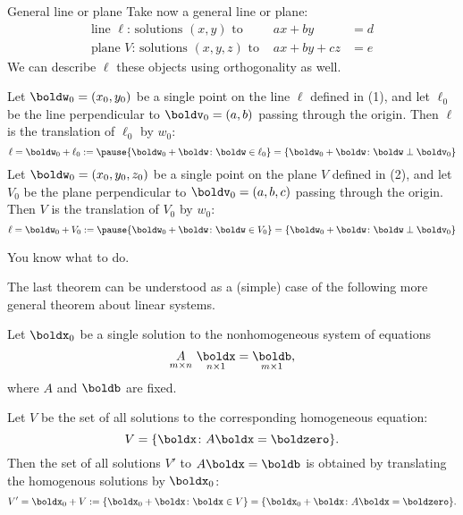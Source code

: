 \begin{frame}{General line or plane}
Take now a general line or plane:
\begin{eqnarray}
\text{line $\ell$: solutions $(x,y)$ to } &ax+by&=d\\
\text{plane $V$: solutions $(x,y,z)$ to } &ax+by+cz&=e
\end{eqnarray}
\pause 
We can describe $\ell$ these objects using orthogonality as well. 
\begin{theorem}
Let $\boldw_0=(x_0,y_0)$ be a single point on the line $\ell$ defined in (1), and let $\ell_0$ be the line perpendicular to $\boldv_0=(a,b)$ passing through the origin. Then $\ell$ is the translation of $\ell_0$ by $w_0$: 
\[
\ell=\boldw_0+\ell_0:=\pause\{\boldw_0+\boldw\colon \boldw\in\ell_0\}=
\{\boldw_0+\boldw\colon \boldw\perp\boldv_0\}
\]
\pause
Let $\boldw_0=(x_0,y_0,z_0)$ be a single point on the plane $V$ defined in (2), and let $V_0$ be the plane perpendicular to $\boldv_0=(a,b,c)$ passing through the origin. Then $V$ is the translation of $V_0$ by $w_0$: 
\[
\ell=\boldw_0+V_0:=\pause\{\boldw_0+\boldw\colon \boldw\in V_0\}=
\{\boldw_0+\boldw\colon \boldw\perp\boldv_0\}
\]
\end{theorem}
\end{frame}
\begin{frame}
You know what to do.
\end{frame}
\begin{frame}
The last theorem can be understood as a (simple) case of the following more general theorem about linear systems. 
\begin{theorem}
Let $\boldx_0$ be a single solution to the nonhomogeneous system of equations
\[
\underset{m\times n}{A}\ \underset{n\times 1}{\boldx}=\underset{m\times 1}{\boldb},
\]
where $A$ and $\boldb$ are fixed. 

\pause Let $V$ be the set of \alert{all} solutions to the corresponding homogeneous equation:
\[
V=\{\boldx\colon A\boldx=\boldzero\}.
\]
\pause Then the set of all solutions $V'$ to $A\boldx=\boldb$ is obtained by translating the homogenous solutions by $\boldx_0$:
\[
V'=\boldx_0+V:=\{\boldx_0+\boldx\colon \boldx\in V\}=\{\boldx_0+\boldx\colon A\boldx=\boldzero\}.
\]
\end{theorem}
\end{frame}
